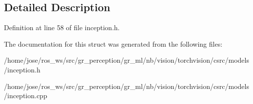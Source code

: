 \subsection{Detailed Description}


Definition at line 58 of file inception.\+h.



The documentation for this struct was generated from the following files\+:\begin{DoxyCompactItemize}
\item 
/home/jose/ros\+\_\+ws/src/gr\+\_\+perception/gr\+\_\+ml/nb/vision/torchvision/csrc/models/inception.\+h\item 
/home/jose/ros\+\_\+ws/src/gr\+\_\+perception/gr\+\_\+ml/nb/vision/torchvision/csrc/models/inception.\+cpp\end{DoxyCompactItemize}
